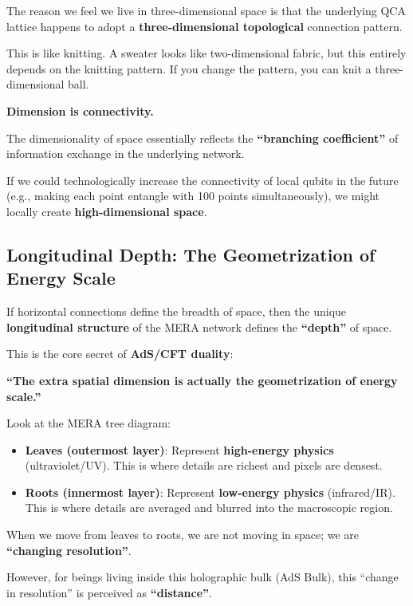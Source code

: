 The reason we feel we live in three-dimensional space is that the underlying QCA lattice happens to adopt a \textbf{three-dimensional topological} connection pattern.

This is like knitting. A sweater looks like two-dimensional fabric, but this entirely depends on the knitting pattern. If you change the pattern, you can knit a three-dimensional ball.

\textbf{Dimension is connectivity.}

The dimensionality of space essentially reflects the \textbf{``branching coefficient''} of information exchange in the underlying network.

If we could technologically increase the connectivity of local qubits in the future (e.g., making each point entangle with 100 points simultaneously), we might locally create \textbf{high-dimensional space}.

\subsection{Longitudinal Depth: The Geometrization of Energy Scale}

If horizontal connections define the breadth of space, then the unique \textbf{longitudinal structure} of the MERA network defines the \textbf{``depth''} of space.

This is the core secret of \textbf{AdS/CFT duality}:

\textbf{``The extra spatial dimension is actually the geometrization of energy scale.''}

Look at the MERA tree diagram:

\begin{itemize}
\item \textbf{Leaves (outermost layer)}: Represent \textbf{high-energy physics} (ultraviolet/UV). This is where details are richest and pixels are densest.

\item \textbf{Roots (innermost layer)}: Represent \textbf{low-energy physics} (infrared/IR). This is where details are averaged and blurred into the macroscopic region.
\end{itemize}

When we move from leaves to roots, we are not moving in space; we are \textbf{``changing resolution''}.

However, for beings living inside this holographic bulk (AdS Bulk), this ``change in resolution'' is perceived as \textbf{``distance''}.

